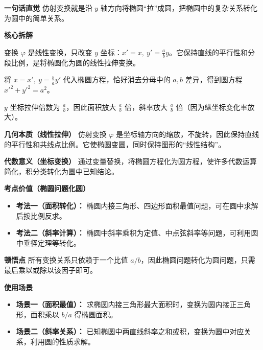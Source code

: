 \begin{explanationbox}
	\textbf{\textcolor{CExplanation}{一句话直觉}}
	仿射变换就是沿 $y$ 轴方向将椭圆“拉”成圆，把椭圆中的复杂关系转化为圆中的简单关系。

	\medskip
	\textbf{\textcolor{CExplanation}{核心拆解}}
	\begin{description}[style=nextline, leftmargin=2.8em, labelsep=0.5em, itemsep=0.45em]
		\item[\textbf{要点一（变换性质）：}]
			变换 $\varphi$ 是线性变换，只改变 $y$ 坐标：$x'=x,\ y'=\frac{a}{b}y$。它保持直线的平行性和分段比例，是将椭圆化为圆的线性拉伸变换。
		\item[\textbf{要点二（化圆过程）：}]
			将 $x=x',\ y=\frac{b}{a}y'$ 代入椭圆方程，恰好消去分母中的 $a,b$ 差异，得到圆方程 $x'^2+y'^2=a^2$。
		\item[\textbf{要点三（缩放因子）：}]
			$y$ 坐标拉伸倍数为 $\frac{a}{b}$，因此面积放大 $\frac{a}{b}$ 倍，斜率放大 $\frac{a}{b}$ 倍（因为纵坐标变化率放大）。
	\end{description}

	\medskip
	\textbf{\textcolor{CExplanation}{几何本质（线性拉伸）}}
	仿射变换 $\varphi$ 是坐标轴方向的缩放，不旋转，因此保持直线的平行性和共线点比例。它使椭圆变圆，同时保持图形的“线性结构”。

	\medskip
	\textbf{\textcolor{CExplanation}{代数意义（坐标变换）}}
	通过变量替换，将椭圆方程化为圆方程，使许多代数运算简化，积分类转化为圆中已知结论。

	\medskip
	\textbf{\textcolor{CExplanation}{考点价值（椭圆问题化圆）}}
	\begin{itemize}[leftmargin=*, itemsep=0.5em, topsep=0.4em]
		\item \textbf{考法一（面积转化）：} 椭圆内接三角形、四边形面积最值问题，可在圆中求解后按比例反求。
		\item \textbf{考法二（斜率计算）：} 椭圆中斜率乘积为定值、中点弦斜率等问题，可利用圆中垂径定理等转化。
	\end{itemize}

	\medskip
	\textbf{\textcolor{CExplanation}{顿悟点}}
	所有变换关系只依赖于一个比值 $a/b$，因此椭圆问题转化为圆问题，只需最后乘以或除以该因子即可。

	\medskip
	\textbf{\textcolor{CExplanation}{使用场景}}
	\begin{itemize}[leftmargin=*, itemsep=0.5em, topsep=0.4em]
		\item \textbf{场景一（面积最值）：} 求椭圆内接三角形最大面积时，变换为圆内接正三角形，面积乘以 $b/a$ 得椭圆面积。
		\item \textbf{场景二（斜率关系）：} 已知椭圆中两直线斜率之和或积，变换为圆中对应关系，利用圆的性质求解。
	\end{itemize}

\end{explanationbox}
